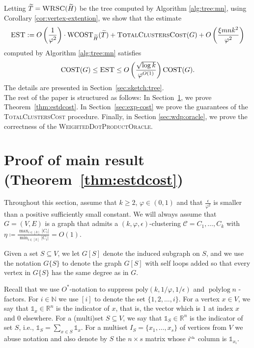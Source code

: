 \documentclass[letterpaper,11pt]{article}
\newcommand{\CT}{\text{COST}}
\newcommand{\wCT}{\text{WCOST}}
\newcommand{\est}{O\left(\frac{1}{\varphi^2}\right)\cdot  \wCT_{\wt{H}}(\wt{T}) + \textsc{TotalClustersCost}(G)+ O\left(\frac{\xi m n k^2 }{\varphi^2} \right) }
\newcommand{\eqdef}{:=}
\newcommand{\estg}{\textsc{EST}}
\theoremstyle{plain}
\theoremstyle{definition}
\theoremstyle{remark}
\newcommand{\e}{\epsilon}
\newcommand{\poly}{\text{poly}}
\newcommand{\wt}[1]{\widetilde{#1}}
\def\polylog{\operatorname{polylog}}
\begin{document}
Letting  $\widetilde{T}=\textsc{WRSC}(\widetilde{H})$  be the tree computed by Algorithm \ref{alg:tree:mn}, using Corollary \ref{cor:vertex-extention}, we show that
the estimate 
$$\estg \eqdef \est$$ computed by Algorithm \ref{alg:tree:mn} satisfies 
\[\CT(G) \leq \estg\leq O\left(\frac{\sqrt{ \log k}}{\varphi^{O(1)}} \right)\CT(G). \]
The details are presented in Section~\ref{sec:sketch:tree}.\\

 
The rest of the paper is structured as follows:
In Section~\ref{sec:estimate-cost}, we prove Theorem~\ref{thm:estdcost}. In Section~\ref{sec:exp-cost} we prove the guarantees of the \textsc{TotalClustersCost} procedure. Finally, in Section \ref{sec:wdp:oracle}, we prove the correctness of the \textsc{WeightedDotProductOracle}. 





 

\newpage

{
\small


}
\newpage

\tableofcontents
\appendix



\section{Proof of main result (Theorem~\ref{thm:estdcost})} \label{sec:estimate-cost}
Throughout this section, assume that $k \geq 2$, $\varphi\in (0,1)$ and that $\frac{\epsilon}{\varphi^2}$ is smaller than a positive sufficiently small
constant. We will always assume that $G=(V,E)$ is a graph that admits a $(k,\varphi,\epsilon)$-clustering $\mathcal{C} = C_1, \ldots , C_k$ with $\eta \coloneqq \frac{\max_{i \in [k]} |C_i|}{ \min_{i \in [k]} |C_i|} = O(1).$

Given a set $S \subseteq V$, we let $G[S]$ denote the induced subgraph on $S$, and we use the notation $G\{S\}$ to denote the graph $G[S]$ with self loops added so that every vertex in $G\{S\}$ has the same degree as in $G$. 

Recall that we use $O^*$-notation to suppress $\poly (k,  1/\varphi,  1/\e)$ and $\polylog n$ -factors. 
For $i \in \mathbb{N}$ we use $[i]$ to denote the set $\{1,2, \dots, i \}$. For a vertex $x\in V$, we say that $\mathds{1}_x\in\mathbb{R}^{n}$ is the indicator of $x$, that is, the vector which is $1$ at index $x$ and $0$ elsewhere. For a (multi)set $S\subseteq V$, we say that $\mathds{1}_S\in\mathbb{R}^{n}$ is the indicator of set $S$, i.e., $\mathds{1}_S=\sum_{x\in S}\mathds{1}_x$. For a multiset $I_S=\{x_1,\ldots,x_s\}$ of vertices from $V$ we abuse notation and also denote by $S$ the $n \times s$ matrix whose $i^{\text{\tiny{th}}}$ column is $\mathds{1}_{x_i}$. 
\end{document}
